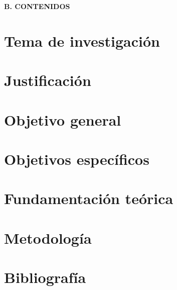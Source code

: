 \documentclass{perfil}
\begin{document}


\renewcommand{\thepage}{\arabic{page}}%
\begin{center} \textbf{B. CONTENIDOS} \end{center}

\section{Tema de investigación}


% 

\section{Justificación}


\section{Objetivo general}


\section{Objetivos específicos}


\section{Fundamentación teórica}



\section{Metodología}







% 
% 

% 

% 

\section{Bibliografía}

\end{document}
